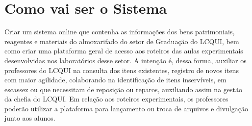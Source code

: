 \section{Como vai ser o Sistema}

Criar um sistema online que contenha as informações dos bens patrimoniais, reagentes e materiais do almoxarifado do setor de Graduação do LCQUI, bem como criar uma plataforma geral de acesso aos roteiros das aulas experimentais desenvolvidas nos laboratórios desse setor. A intenção é, dessa forma, auxiliar os professores do LCQUI na consulta dos itens existentes, registro de novos itens com maior agilidade, colaborando na identificação de itens inservíveis, em escassez ou que necessitam de reposição ou reparos, auxiliando assim na gestão da chefia do LCQUI. Em relação aos roteiros experimentais, os professores poderão utilizar a plataforma para lançamento ou troca de arquivos e divulgação junto aos alunos.
